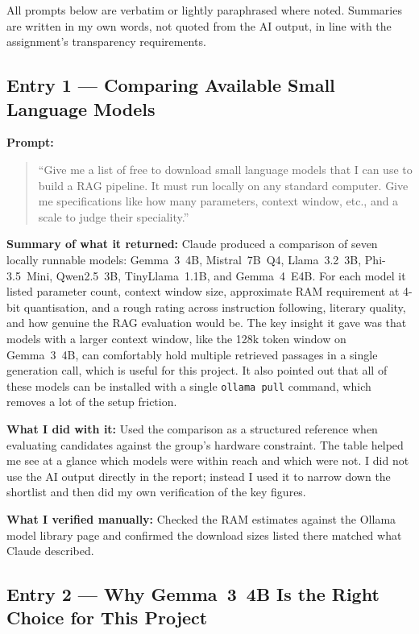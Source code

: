 \documentclass[10pt,conference]{IEEEtran}
\begin{document}
All prompts below are verbatim or lightly paraphrased where noted.
Summaries are written in my own words, not quoted from the AI output,
in line with the assignment's transparency requirements.

\subsection*{Entry 1 --- Comparing Available Small Language Models}

\textbf{Prompt:}
\begin{quote}
``Give me a list of free to download small language models that I can use
to build a RAG pipeline. It must run locally on any standard computer.
Give me specifications like how many parameters, context window, etc.,
and a scale to judge their speciality.''
\end{quote}

\textbf{Summary of what it returned:}
Claude produced a comparison of seven locally runnable models: Gemma~3~4B,
Mistral~7B~Q4, Llama~3.2~3B, Phi-3.5~Mini, Qwen2.5~3B, TinyLlama~1.1B,
and Gemma~4~E4B. For each model it listed parameter count, context window
size, approximate RAM requirement at 4-bit quantisation, and a rough rating
across instruction following, literary quality, and how genuine the RAG
evaluation would be. The key insight it gave was that models with a
larger context window, like the 128k token window on Gemma~3~4B, can
comfortably hold multiple retrieved passages in a single generation call,
which is useful for this project. It also pointed out that all of these
models can be installed with a single \texttt{ollama pull} command,
which removes a lot of the setup friction.

\textbf{What I did with it:}
Used the comparison as a structured reference when evaluating candidates
against the group's hardware constraint. The table helped me see at a
glance which models were within reach and which were not. I did not use
the AI output directly in the report; instead I used it to narrow down
the shortlist and then did my own verification of the key figures.

\textbf{What I verified manually:}
Checked the RAM estimates against the Ollama model library page and
confirmed the download sizes listed there matched what Claude described.

\subsection*{Entry 2 --- Why Gemma~3~4B Is the Right Choice for This Project}
\end{document}
